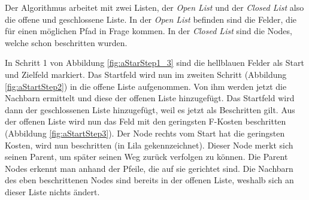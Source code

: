 Der Algorithmus arbeitet mit zwei Listen, der \textit{Open List} und der \textit{Closed List} also die offene und geschlossene Liste. In der \textit{Open List} befinden sind die Felder, die für einen möglichen Pfad in Frage kommen. In der \textit{Closed List} sind die Nodes, welche schon beschritten wurden.\cite{astar_intro}

In Schritt 1 von Abbildung \ref{fig:aStarStep1_3} sind die hellblauen Felder als Start und Zielfeld markiert. Das Startfeld wird nun im zweiten Schritt (Abbildung \ref{fig:aStartStep2}) in die offene Liste aufgenommen. Von ihm werden jetzt die Nachbarn ermittelt und diese der offenen Liste hinzugefügt. Das Startfeld wird dann der geschlossenen Liste hinzugefügt, weil es jetzt als Beschritten gilt. Aus der offenen Liste wird nun das Feld mit den geringsten F-Kosten beschritten (Abbildung \ref{fig:aStartStep3}). Der Node rechts vom Start hat die geringsten Kosten, wird nun beschritten (in Lila gekennzeichnet). Dieser Node merkt sich seinen Parent, um später seinen Weg zurück verfolgen zu können. Die Parent Nodes erkennt man anhand der Pfeile, die auf sie gerichtet sind. Die Nachbarn des eben beschrittenen Nodes sind bereits in der offenen Liste, weshalb sich an dieser Liste nichts ändert.

